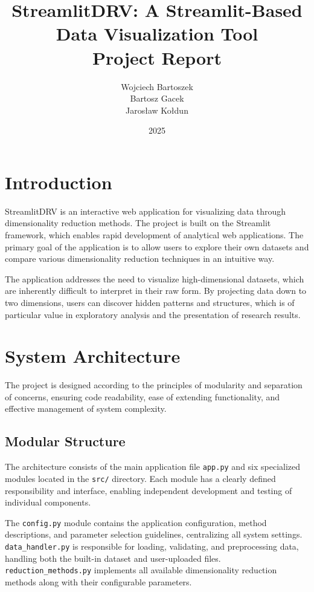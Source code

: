 \documentclass[a4paper, 12pt]{article}
\title{StreamlitDRV: A Streamlit-Based Data Visualization Tool\\ \vspace{1.5em}
Project Report}
\author{Wojciech Bartoszek \\ Bartosz Gacek \\ Jarosław Kołdun}
\date{2025}
\begin{document}
\maketitle

\section{Introduction}

StreamlitDRV is an interactive web application for visualizing data through dimensionality reduction methods. The project is built on the Streamlit framework, which enables rapid development of analytical web applications. The primary goal of the application is to allow users to explore their own datasets and compare various dimensionality reduction techniques in an intuitive way.

The application addresses the need to visualize high-dimensional datasets, which are inherently difficult to interpret in their raw form. By projecting data down to two dimensions, users can discover hidden patterns and structures, which is of particular value in exploratory analysis and the presentation of research results.

\section{System Architecture}

The project is designed according to the principles of modularity and separation of concerns, ensuring code readability, ease of extending functionality, and effective management of system complexity.

\subsection{Modular Structure}

The architecture consists of the main application file \texttt{app.py} and six specialized modules located in the \texttt{src/} directory. Each module has a clearly defined responsibility and interface, enabling independent development and testing of individual components.

The \texttt{config.py} module contains the application configuration, method descriptions, and parameter selection guidelines, centralizing all system settings. \texttt{data\_handler.py} is responsible for loading, validating, and preprocessing data, handling both the built-in dataset and user-uploaded files. \texttt{reduction\_methods.py} implements all available dimensionality reduction methods along with their configurable parameters.
\end{document}
